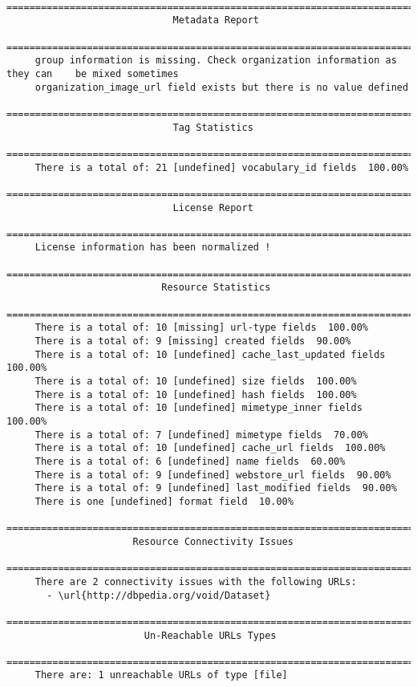 \begin{lstlisting}
    =======================================================================
                             Metadata Report
    =======================================================================
     group information is missing. Check organization information as they can    be mixed sometimes
     organization_image_url field exists but there is no value defined
    =======================================================================
                             Tag Statistics
    =======================================================================
     There is a total of: 21 [undefined] vocabulary_id fields  100.00%
    =======================================================================
                             License Report
    =======================================================================
     License information has been normalized !
    =======================================================================
                           Resource Statistics
    =======================================================================
     There is a total of: 10 [missing] url-type fields  100.00%
     There is a total of: 9 [missing] created fields  90.00%
     There is a total of: 10 [undefined] cache_last_updated fields  100.00%
     There is a total of: 10 [undefined] size fields  100.00%
     There is a total of: 10 [undefined] hash fields  100.00%
     There is a total of: 10 [undefined] mimetype_inner fields  100.00%
     There is a total of: 7 [undefined] mimetype fields  70.00%
     There is a total of: 10 [undefined] cache_url fields  100.00%
     There is a total of: 6 [undefined] name fields  60.00%
     There is a total of: 9 [undefined] webstore_url fields  90.00%
     There is a total of: 9 [undefined] last_modified fields  90.00%
     There is one [undefined] format field  10.00%
    =======================================================================
                      Resource Connectivity Issues
    =======================================================================
     There are 2 connectivity issues with the following URLs:
       - \url{http://dbpedia.org/void/Dataset}
    =======================================================================
                        Un-Reachable URLs Types
    =======================================================================
     There are: 1 unreachable URLs of type [file]
\end{lstlisting}

